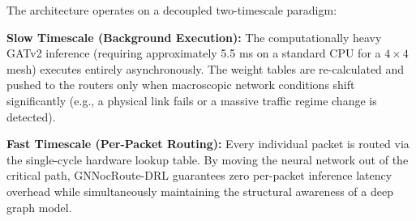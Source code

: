 The architecture operates on a decoupled two-timescale paradigm:

\textbf{Slow Timescale (Background Execution):} The computationally heavy GATv2 inference (requiring approximately 5.5 ms on a standard CPU for a $4\times4$ mesh) executes entirely asynchronously. The weight tables are re-calculated and pushed to the routers only when macroscopic network conditions shift significantly (e.g., a physical link fails or a massive traffic regime change is detected).

\textbf{Fast Timescale (Per-Packet Routing):} Every individual packet is routed via the single-cycle hardware lookup table. By moving the neural network out of the critical path, GNNocRoute-DRL guarantees zero per-packet inference latency overhead while simultaneously maintaining the structural awareness of a deep graph model.
